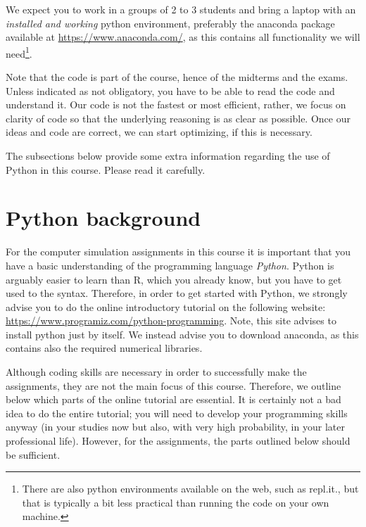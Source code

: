 We expect you to work in a groups of 2 to 3 students and bring a laptop with an \emph{installed and working} python environment, preferably the anaconda package available at \url{https://www.anaconda.com/}, as this contains all functionality we will need\footnote{There are also python environments available on the web, such as repl.it., but that is typically a bit less practical than running the code on your own machine.}.

Note that the code is part of the course, hence of the midterms and the exams.
Unless indicated as not obligatory, you have to be able to read the code and understand it.
Our code is not the fastest or most efficient, rather, we focus on clarity of code so that the underlying reasoning is as clear as possible.
Once our ideas and code are correct, we can start optimizing, if this is necessary.


The subsections below provide some  extra information regarding the use of Python in this course. Please read it carefully.


\section*{Python background}


For the computer simulation assignments in this course it is important that you have a basic understanding of the programming language \emph{Python}.
Python is arguably easier to learn than R, which you already know, but you have to get used to the syntax.
Therefore, in order to get started with Python, we strongly advise you to do the online introductory tutorial on the following website: \url{https://www.programiz.com/python-programming}.
Note, this site advises to install python just by itself.
We instead advise you to download anaconda, as this contains also the required numerical libraries.

Although coding skills are necessary in order to successfully make the assignments, they are not the main focus of this course.
Therefore, we outline below which parts of the online tutorial are essential.
It is certainly not a bad idea to do the entire tutorial; you will need to develop your programming skills anyway (in your studies now but also, with very high probability, in your later professional life).
However, for the assignments, the parts outlined below should be sufficient.

